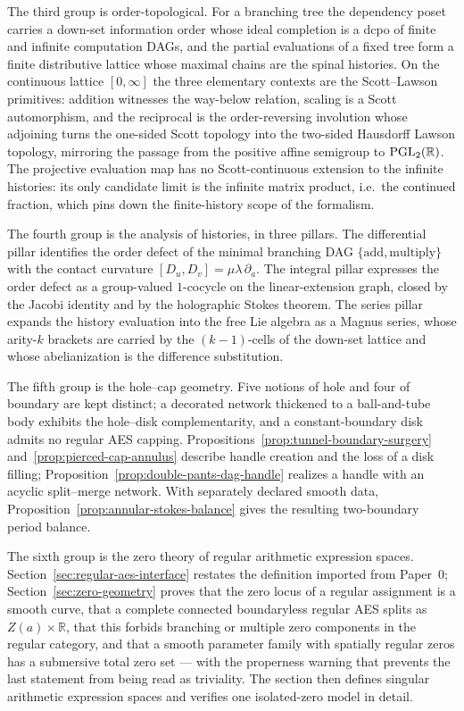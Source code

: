 The third group is order-topological.  For a branching tree the dependency
poset carries a down-set information order whose ideal completion is a dcpo of
finite and infinite computation DAGs, and the partial evaluations of a fixed
tree form a finite distributive lattice whose maximal chains are the spinal
histories.  On the continuous lattice $[0,\infty]$ the three elementary contexts
are the Scott--Lawson primitives: addition witnesses the way-below relation,
scaling is a Scott automorphism, and the reciprocal is the order-reversing
involution whose adjoining turns the one-sided Scott topology into the two-sided
Hausdorff Lawson topology, mirroring the passage from the positive affine
semigroup to $\operatorname{PGL}_2(\mathbb R)$.  The projective evaluation map has no
Scott-continuous extension to the infinite histories: its only candidate limit
is the infinite matrix product, i.e.\ the continued fraction, which pins down
the finite-history scope of the formalism.

The fourth group is the analysis of histories, in three pillars.  The
differential pillar identifies the order defect of the minimal branching DAG
$\{\text{add},\text{multiply}\}$ with the contact curvature
$[D_u,D_v]=\mu\lambda\,\partial_a$.  The integral pillar expresses the order
defect as a group-valued $1$-cocycle on the linear-extension graph, closed by
the Jacobi identity and by the holographic Stokes theorem.  The series pillar
expands the history evaluation into the free Lie algebra as a Magnus series,
whose arity-$k$ brackets are carried by the $(k-1)$-cells of the down-set
lattice and whose abelianization is the difference substitution.

The fifth group is the hole--cap geometry.  Five notions of hole and four of
boundary are kept distinct; a decorated network thickened to a ball-and-tube
body exhibits the hole--disk complementarity, and a constant-boundary disk
admits no regular AES capping.  Propositions~\ref{prop:tunnel-boundary-surgery}
and~\ref{prop:pierced-cap-annulus} describe handle creation and the loss of a
disk filling; Proposition~\ref{prop:double-pants-dag-handle} realizes a handle
with an acyclic split--merge network.  With separately declared smooth data,
Proposition~\ref{prop:annular-stokes-balance} gives the resulting two-boundary
period balance.

The sixth group is the zero theory of regular arithmetic expression spaces.
Section~\ref{sec:regular-aes-interface} restates the definition imported from
Paper~0; Section~\ref{sec:zero-geometry} proves that the zero locus of a regular
assignment is a smooth curve, that a complete connected boundaryless regular AES
splits as $Z(a)\times\mathbb R$, that this forbids branching or multiple zero
components in the regular category, and that a smooth parameter family with
spatially regular zeros has a submersive total zero set --- with the properness
warning that prevents the last statement from being read as triviality.  The
section then defines singular arithmetic expression spaces and verifies one
isolated-zero model in detail.


